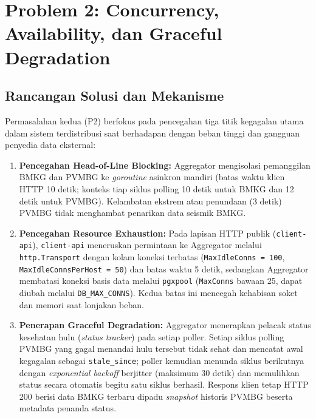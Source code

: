 \clearpage
\section{Problem 2: Concurrency, Availability, dan Graceful Degradation}

\subsection{Rancangan Solusi dan Mekanisme}
Permasalahan kedua (P2) berfokus pada pencegahan tiga titik kegagalan utama dalam sistem terdistribusi saat berhadapan dengan beban tinggi dan gangguan penyedia data eksternal:
\begin{enumerate}
    \item \textbf{Pencegahan Head-of-Line Blocking:} Aggregator mengisolasi pemanggilan BMKG dan PVMBG ke \textit{goroutine} asinkron mandiri (batas waktu klien HTTP 10 detik; konteks tiap siklus polling 10 detik untuk BMKG dan 12 detik untuk PVMBG). Kelambatan ekstrem atau penundaan (3 detik) PVMBG tidak menghambat penarikan data seismik BMKG.
    \item \textbf{Pencegahan Resource Exhaustion:} Pada lapisan HTTP publik (\texttt{client-api}), \texttt{client-api} meneruskan permintaan ke Aggregator melalui \texttt{http.Transport} dengan kolam koneksi terbatas (\texttt{MaxIdleConns = 100}, \texttt{MaxIdleConnsPerHost = 50}) dan batas waktu 5 detik, sedangkan Aggregator membatasi koneksi basis data melalui \texttt{pgxpool} (\texttt{MaxConns} bawaan 25, dapat diubah melalui \texttt{DB\_MAX\_CONNS}). Kedua batas ini mencegah kehabisan soket dan memori saat lonjakan beban.
    \item \textbf{Penerapan Graceful Degradation:} Aggregator menerapkan pelacak status kesehatan hulu (\textit{status tracker}) pada setiap poller. Setiap siklus polling PVMBG yang gagal menandai hulu tersebut tidak sehat dan mencatat awal kegagalan sebagai \texttt{stale\_since}; poller kemudian menunda siklus berikutnya dengan \textit{exponential backoff} berjitter (maksimum 30 detik) dan memulihkan status secara otomatis begitu satu siklus berhasil. Respons klien tetap HTTP 200 berisi data BMKG terbaru dipadu \textit{snapshot} historis PVMBG beserta metadata penanda status.
\end{enumerate}


